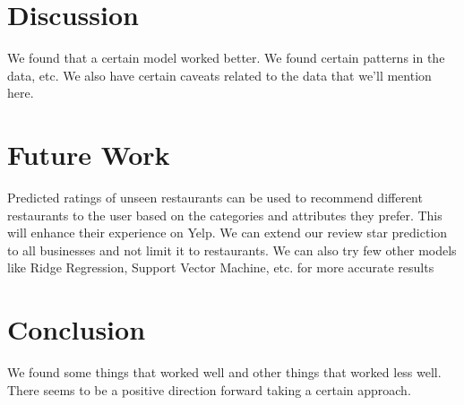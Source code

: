 \documentclass[12pt]{article}
\begin{document}
\section{Discussion}

We found that a certain model worked better. We found certain patterns
in the data, etc. We also have certain caveats related to the data that
we'll mention here.

\section{Future Work}

Predicted ratings of unseen restaurants can be used to recommend different restaurants to the user based 
on the categories and attributes they prefer. This will enhance their experience on Yelp. 
We can extend our review star prediction to all businesses and not limit it to restaurants. 
We can also try few other models like Ridge Regression, Support Vector Machine, etc. for more accurate results

\section{Conclusion}

We found some things that worked well and other things that worked
less well. There seems to be a positive direction forward taking a
certain approach.


 

\end{document}

